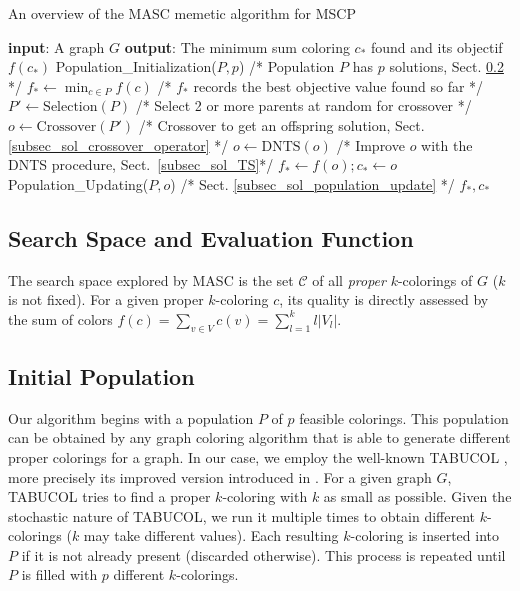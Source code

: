 \documentclass{elsart}
\begin{document}
\begin{algorithm}\footnotesize
\caption{An overview of the MASC memetic algorithm for MSCP}\label{Algo_MASC}
\begin{algorithmic}[1]
\STATE \textbf{input}: A graph $G$
   \STATE \textbf{output}: The minimum sum coloring $c_*$ found and its objectif $f(c_*)$ 
   \STATE Population\_Initialization($P,p$) /* Population $P$ has $p$ solutions, Sect. \ref{subsec_sol_initial_population} */
   \STATE $f_* \gets \min_{c \in P} f(c)$ /* $f_*$ records the best objective value found so far */
       \STATE $P' \gets \textrm{Selection}(P)$ /* Select 2 or more parents at random for crossover */
        \STATE $o \gets \textrm{Crossover}(P')$ /* Crossover to get an offspring solution, Sect. \ref{subsec_sol_crossover_operator} */
        \STATE $o \gets \textrm{DNTS}(o)$
        		/* Improve $o$ with the DNTS procedure, Sect.~\ref{subsec_sol_TS}*/
           \STATE $f_* \gets f(o); c_*  \gets o$
        \ENDIF
        \STATE Population\_Updating($P, o$) /* Sect. \ref{subsec_sol_population_update} */ 
   \ENDFOR
   \RETURN $f_*, c_*$
\end{algorithmic}
\end{algorithm}

\subsection{Search Space and Evaluation Function}
\label{Search Space}

The search space explored by MASC is the set $\mathcal{C}$ of all \textsl{proper} $k$-colorings of $G$ ($k$ is not fixed). For a given proper $k$-coloring $c$, its quality is directly assessed by the sum of colors $f(c) = \sum_{v \in V} c(v) = \sum_{l = 1}^k l|V_l|$. 

\subsection{Initial Population}
\label{subsec_sol_initial_population}

Our algorithm begins with a population $P$ of $p$ feasible colorings. This population can be obtained by any graph coloring algorithm that is able to generate different proper colorings for a graph. In our case, we employ the well-known TABUCOL \cite{Hertz&DeWerra1987}, more precisely its improved version introduced in \cite{Galinier&Hao1999}. For a given graph $G$, TABUCOL tries to find a proper $k$-coloring with $k$ as small as possible. Given the stochastic nature of TABUCOL, we run it multiple times to obtain different $k$-colorings ($k$ may take different values). Each resulting $k$-coloring is inserted into $P$ if it is not already present (discarded otherwise). This process is repeated until $P$ is filled with $p$ different $k$-colorings.
\end{document}
